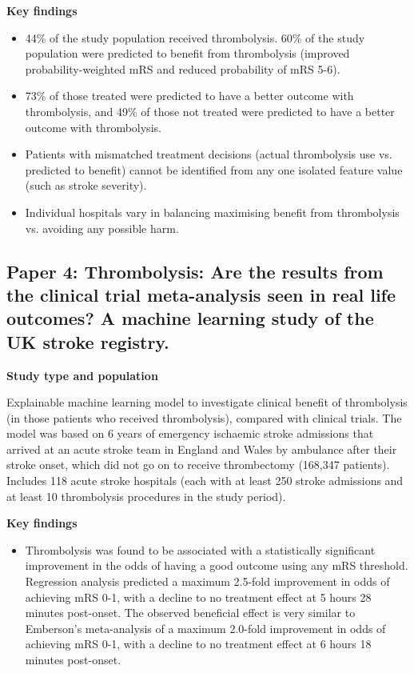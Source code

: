 \textbf{Key findings}

\begin{itemize}
    \item 44\% of the study population received thrombolysis. 60\% of the study population were predicted to benefit from thrombolysis (improved probability-weighted mRS and reduced probability of mRS 5-6).
    
    \item 73\% of those treated were predicted to have a better outcome with thrombolysis, and 49\% of those not treated were predicted to have a better outcome with thrombolysis.
    
    \item Patients with mismatched treatment decisions (actual thrombolysis use vs. predicted to benefit) cannot be identified from any one isolated feature value (such as stroke severity).
    
    \item Individual hospitals vary in balancing maximising benefit from thrombolysis vs. avoiding any possible harm.
\end{itemize}
\subsection{Paper 4: Thrombolysis: Are the results from the clinical trial meta-analysis seen in real life outcomes?  A machine learning study of the UK stroke registry.\cite{pearn_thrombolysis_2024}}

\textbf{Study type and population}

Explainable machine learning model to investigate clinical benefit of thrombolysis (in those patients who received thrombolysis), compared with clinical trials. The model was based on 6 years of emergency ischaemic stroke admissions that arrived at an acute stroke team in England and Wales by ambulance after their stroke onset, which did not go on to receive thrombectomy (168,347 patients). Includes 118 acute stroke hospitals (each with at least 250 stroke admissions and at least 10 thrombolysis procedures in the study period).

\textbf{Key findings}

\begin{itemize}
    \item Thrombolysis was found to be associated with a statistically significant improvement in the odds of having a good outcome using any mRS threshold. Regression analysis predicted a maximum 2.5-fold improvement in odds of achieving mRS 0-1, with a decline to no treatment effect at 5 hours 28 minutes post-onset. The observed beneficial effect is very similar to Emberson’s meta-analysis \cite{emberson_effect_2014} of a maximum 2.0-fold improvement in odds of achieving mRS 0-1, with a decline to no treatment effect at 6 hours 18 minutes post-onset.
    
\end{itemize}

